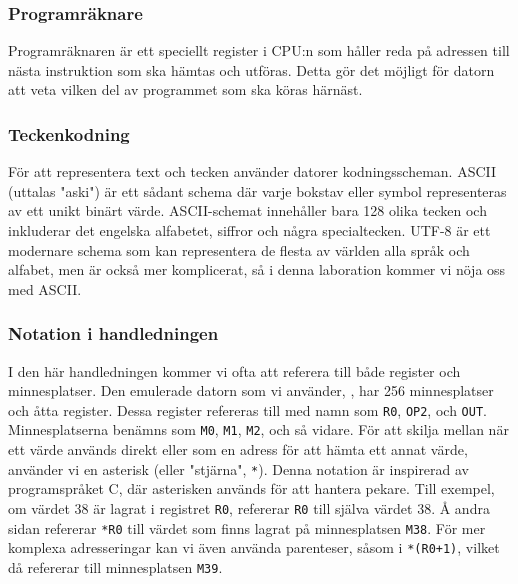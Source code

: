 \subsubsection{Programräknare}
Programräknaren är ett speciellt register i CPU:n som håller reda på adressen till nästa instruktion som ska hämtas och utföras. Detta gör det möjligt för datorn att veta vilken del av programmet som ska köras härnäst.

\subsubsection{Teckenkodning}
För att representera text och tecken använder datorer kodningsscheman. ASCII (uttalas "aski") är ett sådant schema där varje bokstav eller symbol representeras av ett unikt binärt värde. ASCII-schemat innehåller bara 128 olika tecken och inkluderar det engelska alfabetet, siffror och några specialtecken. UTF-8 är ett modernare schema som kan representera de flesta av världen alla språk och alfabet, men är också mer komplicerat, så i denna laboration kommer vi nöja oss med ASCII.

\subsubsection{Notation i handledningen}
I den här handledningen kommer vi ofta att referera till både register och minnesplatser. Den emulerade datorn som vi använder, \progname{}, har 256 minnesplatser och åtta register. Dessa register refereras till med namn som \texttt{R0}, \texttt{OP2}, och \texttt{OUT}. Minnesplatserna benämns som \texttt{M0}, \texttt{M1}, \texttt{M2}, och så vidare. För att skilja mellan när ett värde används direkt eller som en adress för att hämta ett annat värde, använder vi en asterisk (eller "stjärna", \texttt{*}). Denna notation är inspirerad av programspråket C, där asterisken används för att hantera pekare. Till exempel, om värdet 38 är lagrat i registret \texttt{R0}, refererar \texttt{R0} till själva värdet 38. Å andra sidan refererar \texttt{*R0} till värdet som finns lagrat på minnesplatsen \texttt{M38}. För mer komplexa adresseringar kan vi även använda parenteser, såsom i \texttt{*(R0+1)}, vilket då refererar till minnesplatsen \texttt{M39}.



